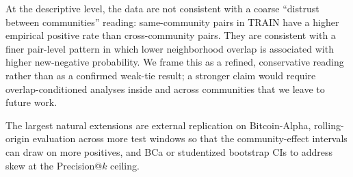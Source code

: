 \documentclass[conference]{IEEEtran}
\begin{document}
At the descriptive level, the data are not consistent with a coarse
``distrust between communities'' reading: same-community pairs in
TRAIN have a higher empirical positive rate than cross-community
pairs. They are consistent with a finer pair-level pattern in which
lower neighborhood overlap is associated with higher new-negative
probability. We frame this as a refined, conservative reading rather
than as a confirmed weak-tie result; a stronger claim would require
overlap-conditioned analyses inside and across communities that we
leave to future work.

The largest natural extensions are external replication on
Bitcoin-Alpha, rolling-origin evaluation across more test windows so
that the community-effect intervals can draw on more positives, and
BCa or studentized bootstrap CIs to address skew at the
Precision@$k$ ceiling.
\end{document}
